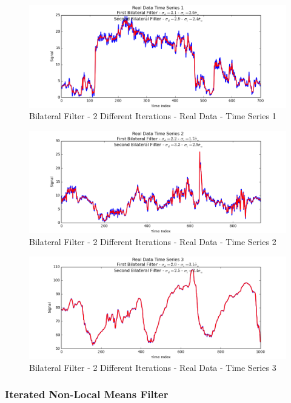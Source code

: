 \documentclass[11pt]{article}
\theoremstyle{definition}
\begin{document}
\begin{figure}
\centering
\includegraphics[width = 0.75 \textwidth]{2DiffBilateralRealSignal1.png}
\caption{Bilateral Filter - 2 Different Iterations - Real Data - Time Series 1}
\label{2diffbilateralrealsignal1}
\end{figure}

\begin{figure}
\centering
\includegraphics[width = 0.75 \textwidth]{2DiffBilateralRealSignal2.png}
\caption{Bilateral Filter - 2 Different Iterations - Real Data - Time Series 2}
\label{2diffbilateralrealsignal2}
\end{figure}

\begin{figure}
\centering
\includegraphics[width = 0.75 \textwidth]{2DiffBilateralRealSignal3.png}
\caption{Bilateral Filter - 2 Different Iterations - Real Data - Time Series 3}
\label{2diffbilateralrealsignal3}
\end{figure}

\newpage

\subsubsection{Iterated Non-Local Means Filter}
\end{document}

